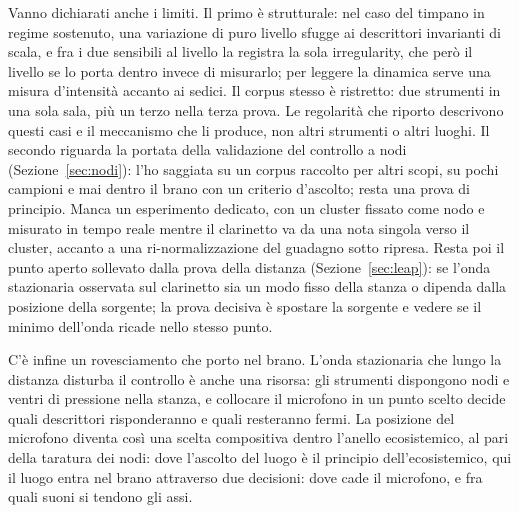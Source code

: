 \documentclass{article}
\begin{document}
Vanno dichiarati anche i limiti. Il primo è strutturale: nel caso del timpano in regime sostenuto, una variazione di puro livello sfugge ai descrittori invarianti di scala, e fra i due sensibili al livello la registra la sola irregularity, che però il livello se lo porta dentro invece di misurarlo; per leggere la dinamica serve una misura d'intensità accanto ai sedici. Il corpus stesso è ristretto: due strumenti in una sola sala, più un terzo nella terza prova. Le regolarità che riporto descrivono questi casi e il meccanismo che li produce, non altri strumenti o altri luoghi. Il secondo riguarda la portata della validazione del controllo a nodi (Sezione~\ref{sec:nodi}): l'ho saggiata su un corpus raccolto per altri scopi, su pochi campioni e mai dentro il brano con un criterio d'ascolto; resta una prova di principio. Manca un esperimento dedicato, con un cluster fissato come nodo e misurato in tempo reale mentre il clarinetto va da una nota singola verso il cluster, accanto a una ri-normalizzazione del guadagno sotto ripresa. Resta poi il punto aperto sollevato dalla prova della distanza (Sezione~\ref{sec:leap}): se l'onda stazionaria osservata sul clarinetto sia un modo fisso della stanza o dipenda dalla posizione della sorgente; la prova decisiva è spostare la sorgente e vedere se il minimo dell'onda ricade nello stesso punto.

C'è infine un rovesciamento che porto nel brano. L'onda stazionaria che lungo la distanza disturba il controllo è anche una risorsa: gli strumenti dispongono nodi e ventri di pressione nella stanza, e collocare il microfono in un punto scelto decide quali descrittori risponderanno e quali resteranno fermi. La posizione del microfono diventa così una scelta compositiva dentro l'anello ecosistemico, al pari della taratura dei nodi: dove l'ascolto del luogo è il principio dell'ecosistemico, qui il luogo entra nel brano attraverso due decisioni: dove cade il microfono, e fra quali suoni si tendono gli assi.

\end{document}
